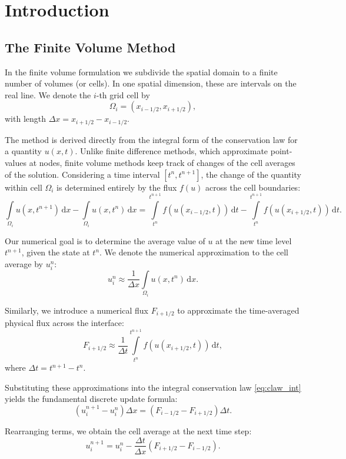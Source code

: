 \chapter{Introduction}%
\label{sec:Introduction}
\section{The Finite Volume Method}%
\label{sub:The Finite Volume Method}
In the finite volume formulation we subdivide the spatial domain to a finite
number of volumes (or cells).
In one spatial dimension, these are intervals on the real line. We denote the
\(i\)-th grid cell by
\[
\Omega_i = (x_{i-1/2}, x_{i+1/2}),
\]
with length \(\Delta x = x_{i+1/2} - x_{i-1/2}\).

The method is derived directly from the integral form of the conservation law
for a quantity \(u(x,t)\). Unlike finite difference methods, which approximate
point-values at nodes, finite volume methods keep track of changes of the cell
averages of the solution. Considering a time interval \([t^n, t^{n+1}]\), the
change of the quantity within cell \(\Omega_i\) is determined entirely by the
flux \(f(u)\) across the cell boundaries:
\begin{equation}
    \label{eq:claw_int}
    \int\limits_{\Omega_i} u(x,t^{n+1}) \,\mathrm{d}x - \int\limits_{\Omega_i} u(x,t^{n}) \,\mathrm{d}x = 
    \int\limits_{t^{n}}^{t^{n+1}} f(u(x_{i-1/2},t)) \,\mathrm{d}t - \int\limits_{t^{n}}^{t^{n+1}} f(u(x_{i+1/2},t)) \,\mathrm{d}t.
\end{equation}

Our numerical goal is to determine the average value of \(u\) at the new time level \(t^{n+1}\), given the state at \(t^n\). We denote the numerical approximation to the cell average by \(u_i^n\):
\[
    u_i^n \approx \frac{1}{\Delta x} \int\limits_{\Omega_i} u(x,t^n) \,\mathrm{d}x.
\]

Similarly, we introduce a numerical flux \(F_{i+1/2}\) to approximate the time-averaged physical flux across the interface:
\[
    F_{i+1/2} \approx \frac{1}{\Delta t} \int\limits_{t^{n}}^{t^{n+1}} f(u(x_{i+1/2},t)) \,\mathrm{d}t,
\]
where \(\Delta t = t^{n+1} - t^n\).

Substituting these approximations into the integral conservation law \eqref{eq:claw_int} yields the fundamental discrete update formula:
\[
    (u_i^{n+1} - u_i^{n}) \Delta x = (F_{i-1/2} - F_{i+1/2}) \Delta t.
\]

Rearranging terms, we obtain the cell average at the next time step:
\begin{equation}
    \label{eq:fvm_general}
    u_i^{n+1} = u_i^{n} - \frac{\Delta t}{\Delta x} \left( F_{i+1/2} - F_{i-1/2} \right).
\end{equation}

